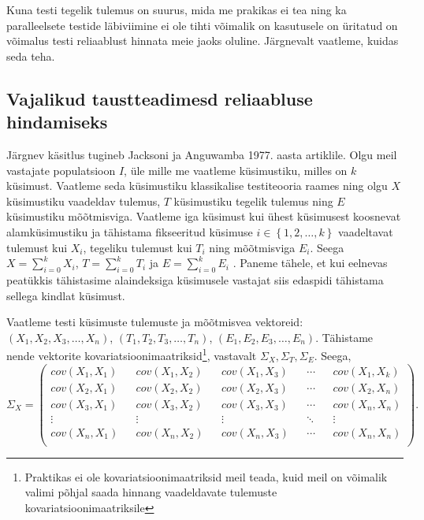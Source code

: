 \documentclass[a4paper,12pt]{article}
\numberwithin{equation}{section}
\theoremstyle{definition}
\begin{document}
Kuna testi tegelik tulemus on suurus, mida me prakikas ei tea ning ka paralleelsete testide läbiviimine ei ole tihti võimalik on kasutusele on üritatud on võimalus testi reliaablust hinnata meie jaoks oluline. Järgnevalt vaatleme, kuidas seda teha.



\subsection{Vajalikud taustteadimesd reliaabluse hindamiseks}

Järgnev käsitlus tugineb Jacksoni ja Anguwamba 1977. aasta artiklile.\cite{Jackson1977}
Olgu meil vastajate populatsioon $I$, üle mille me vaatleme küsimustiku, milles on $k$ k\"usimust. Vaatleme seda küsimustiku klassikalise testiteooria raames ning olgu $X$ küsimustiku vaadeldav tulemus, $T$ küsimustiku tegelik tulemus ning $E$ küsimustiku mõõtmisviga. Vaatleme iga küsimust kui ühest küsimusest koosnevat alamküsimustiku ja tähistama fikseeritud k\"usimuse $ i \in \left\lbrace 1,2,\ldots,k \right\rbrace$ vaadeltavat tulemust kui $X_i$, tegeliku tulemust kui $T_i$ ning mõõtmisviga $E_i$. Seega $X = \sum \limits_{i=0}^{k} X_i$, $T = \sum \limits_{i=0}^{k} T_i$ ja $E = \sum \limits_{i=0}^{k} E_i$ . Paneme tähele, et kui eelnevas peatükkis tähistasime alaindeksiga küsimusele vastajat siis edaspidi tähistama sellega kindlat küsimust. 

Vaatleme testi k\"usimuste tulemuste ja mõõtmisvea vektoreid: $\left( X_1, X_2, X_3, \ldots, X_n \right)$, $\left( T_1, T_2, T_3, \ldots, T_n \right)$, $\left( E_1, E_2, E_3, \ldots, E_n \right)$. Tähistame nende vektorite kovariatsioonimaatriksid\footnote{Praktikas ei ole kovariatsioonimaatriksid meil teada, kuid meil on võimalik valimi põhjal saada hinnang vaadeldavate tulemuste kovariatsioonimaatriksile }, vastavalt $\Sigma_X, \Sigma_T, \Sigma_E$. Seega, 
\small
\begin{equation*}
\Sigma_X = 
\begin{pmatrix}
cov \left(X_1,X_1 \right) && cov\left( X_1,X_2 \right) && cov \left( X_1,X_3 \right) && \cdots && cov \left( X_1,X_k \right) \\
cov \left(X_2, X_1 \right) && cov \left(X_2, X_2 \right) && cov \left(X_2, X_3 \right) && \cdots && cov \left(X_2, X_n \right) \\
cov \left(X_3, X_1 \right) && cov \left(X_3, X_2 \right) && cov \left(X_3, X_3 \right) && \cdots && cov \left(X_n, X_n \right) \\
\vdots && \vdots && \vdots && \ddots && \vdots \\
cov \left(X_n, X_1 \right) && cov \left(X_n, X_2 \right) && cov \left(X_n, X_3 \right) && \cdots && cov \left(X_n, X_n \right) \\
\end{pmatrix}.
\end{equation*}
\normalsize
\end{document}

